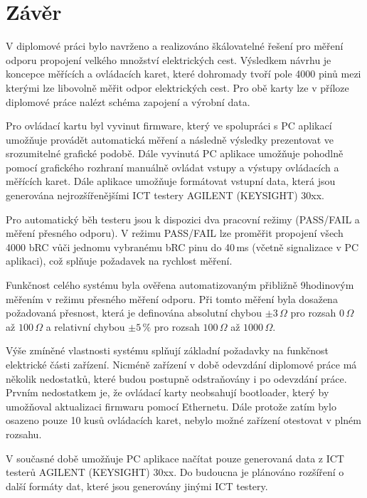 \chapter*{Závěr}
{}
V diplomové práci bylo navrženo a realizováno škálovatelné řešení pro měření
odporu propojení velkého množství elektrických cest. Výsledkem návrhu
je koncepce měřících a ovládacích karet, které dohromady tvoří pole 4000 pinů
mezi kterými lze libovolně měřit odpor elektrických cest. Pro obě karty
lze v příloze diplomové práce nalézt schéma zapojení a výrobní data.\par

Pro ovládací kartu byl vyvinut firmware, který ve spolupráci s PC aplikací umožňuje provádět automatická měření a
následně výsledky prezentovat ve srozumitelné grafické podobě. Dále vyvinutá PC aplikace umožňuje pohodlně
pomocí grafického rozhraní manuálně ovládat vstupy a výstupy ovládacích a měřících karet.
Dále aplikace umožňuje formátovat vstupní data,
která jsou generována nejrozšířenějšími ICT testery AGILENT (KEYSIGHT) 30xx.\par

Pro automatický běh testeru jsou k dispozici dva pracovní režimy (PASS/FAIL a měření přesného odporu).
V režimu PASS/FAIL lze proměřit propojení všech 4000 bRC
vůči jednomu vybranému bRC pinu do 40\,ms (včetně signalizace v PC aplikaci),
což splňuje požadavek na rychlost měření.\par

Funkčnost celého systému byla ověřena automatizovaným přibližně 9hodinovým měřením 
v režimu přesného měření odporu. Při tomto měření byla dosažena požadovaná přesnost,
která je definována absolutní chybou $\pm3\,\Omega$ pro rozsah $0\,\Omega$ až $100\,\Omega$ a relativní chybou
$\pm5\,\%$ pro rozsah $100\,\Omega$ až $1000\,\Omega$.\par

Výše zmíněné vlastnosti systému splňují základní požadavky na funkčnost elektrické části zařízení.
Nicméně zařízení v době odevzdání diplomové práce má několik nedostatků, které budou postupně odstraňovány
i po odevzdání práce. Prvním nedostatkem je, že ovládací karty neobsahují bootloader,
který by umožňoval aktualizaci firmwaru pomocí Ethernetu. Dále protože zatím bylo osazeno pouze 10 kusů ovládacích karet,
nebylo možné zařízení otestovat v plném rozsahu.\par

V současné době umožňuje PC aplikace načítat pouze generovaná data z ICT testerů AGILENT (KEYSIGHT) 30xx.
Do budoucna je plánováno rozšíření o další formáty dat, které jsou generovány jinými ICT testery.\par

